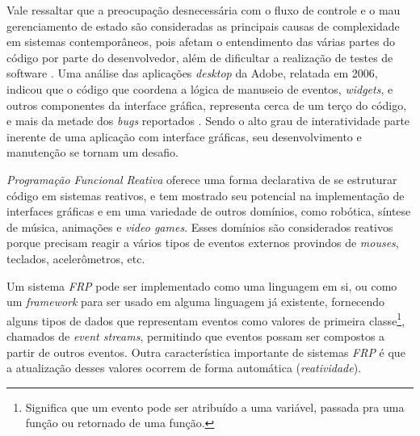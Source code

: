 Vale ressaltar que a preocupação desnecessária com o
fluxo de controle e o mau gerenciamento de estado são
consideradas as principais causas de complexidade em
sistemas contemporâneos, pois afetam o entendimento das
várias partes do código por parte do desenvolvedor,
além de dificultar a realização de testes de software
\cite{Moseley06outof}.
Uma análise das aplicações \textit{desktop} da Adobe,
relatada em 2006, indicou que o código que coordena a
lógica de manuseio de eventos, \textit{widgets}, e outros
componentes da interface gráfica, representa cerca de
um terço do código, e mais da metade dos \textit{bugs}
reportados \cite{jarvi2008property}.
Sendo o alto grau de interatividade parte inerente de uma
aplicação com interface gráficas, seu desenvolvimento e
manutenção se tornam um desafio.


%

\textit{Programação Funcional Reativa} oferece uma forma
declarativa de se estruturar código em sistemas reativos,
e tem mostrado seu potencial na implementação de
interfaces gráficas e em uma variedade de outros domínios,
como robótica, síntese de música, animações e
\textit{video games}. Esses domínios são considerados
reativos porque precisam reagir a vários tipos de
eventos externos provindos de \textit{mouses}, teclados,
acelerômetros, etc.

Um sistema \textit{FRP} pode ser implementado como uma
linguagem em si, ou como um \textit{framework} para ser
usado em alguma linguagem já existente, fornecendo alguns
tipos de dados que representam eventos como valores de
primeira classe\footnote{
  Significa que um evento pode ser atribuído a uma
  variável, passada pra uma função ou retornado de
  uma função.
},
chamados de \textit{event streams}, permitindo que eventos
possam ser compostos a partir de outros eventos.
Outra característica importante de sistemas \textit{FRP}
é que a atualização desses valores ocorrem de forma
automática (\textit{reatividade}).

